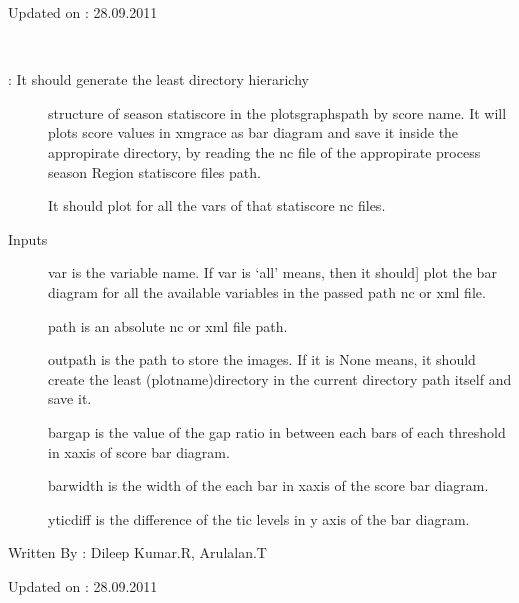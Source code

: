 \documentclass[letterpaper,10pt,english]{sphinxmanual}
\begin{document}
Updated on : 28.09.2011

\begin{fulllineitems}
\label{diagnosis:generate_statistical_score_bars.genBarDiagrams}~\begin{description}
\item[{: It should generate the least directory hierarichy}] \leavevmode
structure of season statiscore in the plotsgraphspath by score name.
It will plots score values in xmgrace as bar diagram and save it
inside the appropirate directory, by reading the nc file of the
appropirate process season Region statiscore files path.

It should plot for all the vars of that statiscore nc files.

\item[{Inputs}] \leavevmode{[}var is the variable name. If var is `all' means, then it should{]}
plot the bar diagram for all the available variables in the passed
path nc or xml file.

path is an absolute nc or xml file path.

outpath is the path to store the images. If it is None means, it
should create the least (plotname)directory in the current
directory path itself and save it.

bargap is the value of the gap ratio in between each bars of each
threshold in xaxis of score bar diagram.

barwidth is the width of the each bar in xaxis of the score
bar diagram.

yticdiff is the difference of the tic levels in y axis of the
bar diagram.

\end{description}

Written By : Dileep Kumar.R, Arulalan.T

Updated on : 28.09.2011

\end{fulllineitems}

\end{document}
